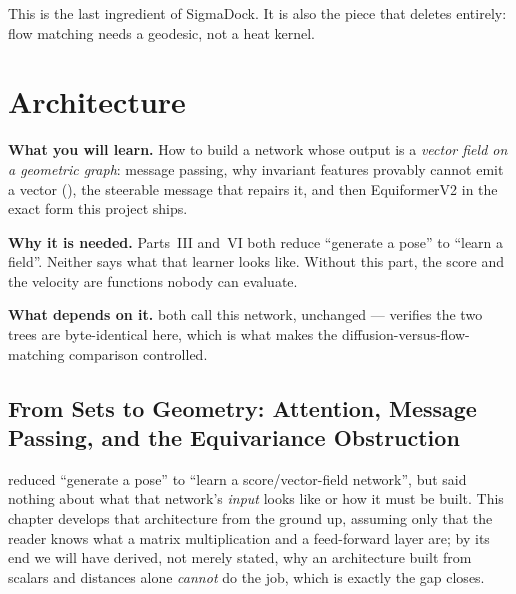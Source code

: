 \documentclass[11pt,a4paper]{report}
\theoremstyle{definition}
\theoremstyle{remark}
\begin{document}
This is the last ingredient of SigmaDock. It is also the piece that  deletes entirely: flow matching needs a geodesic, not a heat kernel.

\clearpage

\part{Architecture}
\label{part:architecture}


\begin{tcolorbox}[colback=gray!4,colframe=gray!55!black,
  title=Part IV at a glance, fonttitle=\bfseries, breakable]
\textbf{What you will learn.} How to build a network whose output is a \emph{vector field on a geometric graph}: message passing, why invariant features provably cannot emit a vector (), the steerable message that repairs it, and then EquiformerV2 in the exact form this project ships.

\textbf{Why it is needed.} Parts~III and~VI both reduce ``generate a pose'' to ``learn a field''. Neither says what that learner looks like. Without this part, the score and the velocity are functions nobody can evaluate.

\textbf{What depends on it.}  both call this network, unchanged ---  verifies the two trees are byte-identical here, which is what makes the diffusion-versus-flow-matching comparison controlled.
\end{tcolorbox}


\chapter{From Sets to Geometry: Attention, Message Passing, and the Equivariance Obstruction}
\label{chap:pre-equiformer}

 reduced ``generate a pose'' to
``learn a score/vector-field network'', but said nothing about what that
network's \emph{input} looks like or how it must be built. This chapter
develops that architecture from the ground up, assuming only that the
reader knows what a matrix multiplication and a feed-forward layer are; by
its end we will have derived, not merely stated, why an architecture built
from scalars and distances alone \emph{cannot} do the job, which is exactly
the gap  closes.
\end{document}
